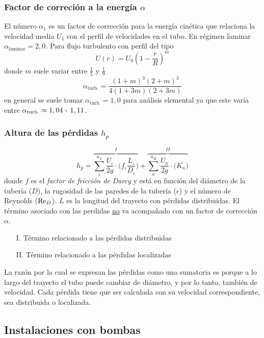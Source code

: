\subsubsection*{Factor de correción a la energía $\alpha$}
El número $\alpha_1$ es un factor de corrección para la energía cinética que relaciona la velocidad media $U_1$ con el perfil de velocidades en el tubo. En régimen laminar $\alpha_{\textrm{laminar}}=2,0$. Para flujo turbulento con perfil del tipo
\[
U(r)=U_0 \left(1-\frac{r}{R}\right)^{m}
\]
donde $m$ suele variar entre $\frac{1}{5}$ y $\frac{1}{9}$
\[
\alpha_{\textrm{turb.}}=\frac{(1+m)^3(2+m)^3}{4(1+3m)(2+3m)}
\]
en general se suele tomar $\alpha_{\textrm{turb.}}=1,0$ para análisis elemental ya que este varía entre $\alpha_{\textrm{turb.}}\approx 1,04\mbox{ - }1,11$.

\subsubsection*{Altura de las pérdidas $h_p$}
\vspace{-.75cm}
\begin{equation} \label{eq:alturaPerdidas}
    h_p=\overbrace{\sum^{n_L}_\iota \frac{U_\iota}{2g} \cdot \bigg(f_\iota\frac{L_\iota}{D_\iota}\bigg)}^{I}+\overbrace{\sum^{n_K}_\kappa \frac{U_\kappa}{2g} \cdot \big(K_\kappa\big)}^{II}
\end{equation}
donde $f$ es el \textit{factor de fricción de Darcy} y está en función del diámetro de la tubería ($D$), la rugosidad de las paredes de la tubería ($\epsilon$) y el número de Reynolds ($\textrm{Re}_D$). $L$ es la longitud del trayecto con pérdidas distribuidas. El término asociado con las perdidas \underline{no} va acompañado con un factor de corrección $\alpha$. 
\begin{itemize}
    \item[I.] Término relacionado a las pérdidas distribuidas
    \vspace{-.2cm}
    \item[II.] Término relacionado a las pérdidas localizadas
\end{itemize}
La razón por la cual se expresan las pérdidas como una sumatoria es porque a lo largo del trayecto el tubo puede cambiar de diámetro, y por lo tanto, también de velocidad. Cada pérdida tiene que ser calculada con su velocidad correspondiente, sea distribuida o localizada.

\subsection{Instalaciones con bombas}

